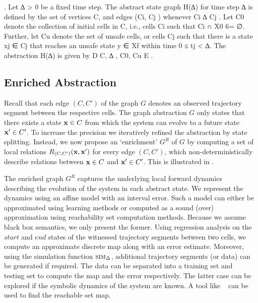 \begin{definition}. Let ∆ > 0 be a fixed time
    step. The abstract state graph H(∆) for time step ∆ is defined by
    the set of vertices C, and edges (Ci, Cj ) whenever Ci ∆ Cj . Let
    C0 denote the collection of initial cells in C, i.e., cells Ci
    such that Ci ∩ X0 6= ∅. Further, let Cu denote the set of unsafe
    cells, or cells Cj such that there is a state xj ∈ Cj that reaches
    an unsafe state y ∈ Xf within time 0 ≤ tj < ∆. The abstraction
H(∆) is given by D C, ∆ , C0, Cu E .  \end{definition}



\subsection{Enriched Abstraction}



Recall that each edge $(C,C')$ of the graph $G$ denotes an observed
trajectory segment between the respective cells. The graph abstraction
$G$ only states that there exists a state $\mathbf{x} \in C$ from which the
system can evolve to a future state $\mathbf{x}' \in C'$. To increase the
precision we iteratively refined the abstraction by state
splitting. Instead, we now propose an `enrichment' $G^R$ of $G$ by computing a
set of local relations $R_{(C,C')}(\mathbf{x},\mathbf{x}')$ for every edge $(C,C')$,
which non-deterministically describe relations between $\mathbf{x} \in C$ and $\mathbf{x}'
\in C'$. This is illustrated in .

The enriched graph $G^R$ captures the underlying local forward
dynamics describing the evolution of the system in each abstract
state. We represent the dynamics using an affine model with an
interval error. Such a model can either be approximated using learning
methods or computed as a sound (over) approximation using reachability
set computation methods. Because we assume black box semantics, we
only present the former. Using regression analysis on the $start$ and
$end$ states of the witnessed trajectory segments between two cells,
we compute an approximate discrete map along with an error estimate.
Moreover, using the simulation function $\mbox{\sc sim}_\Delta$, additional
trajectory segments (or data) can be generated if required. The data
can be separated into a training set and testing set to compute the
map and the error respectively.  The latter case can be explored if
the symbolic dynamics of the system are known. A tool like
\flowstar~\cite{chen2013flow} can be used to find the reachable set
map.

